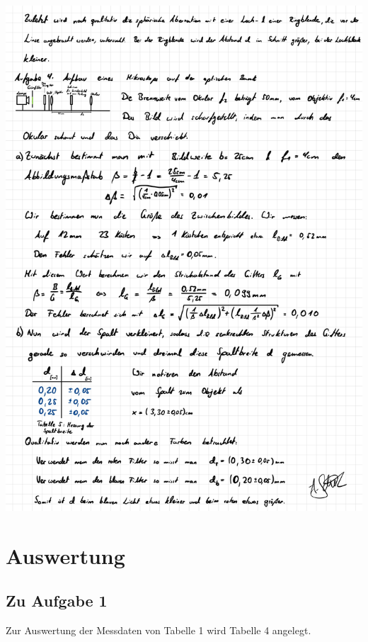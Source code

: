 \documentclass{article}
\begin{document}
\includegraphics[width=\textwidth]{graphics/mess3.jpg}
\newpage

\addtocounter{table}{3}

\section{Auswertung}

\subsection{Zu Aufgabe 1}

Zur Auswertung der Messdaten von Tabelle 1 wird Tabelle 4 angelegt.
\end{document}
